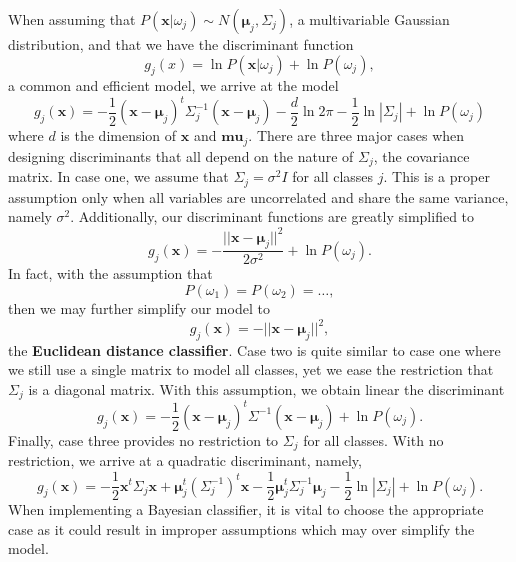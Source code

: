 \documentclass[ 12pt ]{article}
\begin{document}
When assuming that $P(\textbf{x}|\omega_j) \sim N(\mathbf{\mu}_j, \Sigma_j)$, a multivariable Gaussian distribution, and that we have the discriminant function $$g_j(x) = \ln P(\textbf{x}
|\omega_j) + \ln P(\omega_j),$$ a common and efficient model, we arrive at the model $$g_j(\textbf{x}) = -\frac{1}{2}(\textbf{x} - \mathbf{\mu}_j)^t \Sigma_j^{-1}(\textbf{x} -
\mathbf{\mu}_j) - \frac{d}{2} \ln 2\pi - \frac{1}{2} \ln |\Sigma_j| + \ln P(\omega_j)$$ where $d$ is the dimension of $\textbf{x}$ and $\textbf{mu}_j$. There are three major cases when
designing discriminants that all depend on the nature of $\Sigma_j$, the covariance matrix. In case one, we assume that $\Sigma_j = \sigma^2 I$ for all classes $j$. This is a proper
assumption only when all variables are uncorrelated and share the same variance, namely $\sigma^2$. Additionally, our discriminant functions are greatly simplified to $$g_j(\textbf{x})
= -\frac{||\textbf{x} - \mathbf{\mu}_j||^2}{2\sigma^2} + \ln P(\omega_j).$$ In fact, with the assumption that $$P(\omega_1) = P(\omega_2) = \hdots,$$ then we may further simplify our
model to $$g_j(\textbf{x}) = -||\textbf{x} - \mathbf{\mu}_j||^2,$$ the \textbf{Euclidean distance classifier}. Case two is quite similar to case one where we still use a single matrix
to model all classes, yet we ease the restriction that $\Sigma_j$ is a diagonal matrix. With this assumption, we obtain linear the discriminant $$g_j(\textbf{x}) = -\frac{1}{2}(
\textbf{x} - \mathbf{\mu}_j)^t \Sigma^{-1} (\textbf{x} - \mathbf{\mu}_j) + \ln P(\omega_j).$$ Finally, case three provides no restriction to $\Sigma_j$ for all classes. With no
restriction, we arrive at a quadratic discriminant, namely, $$g_j(\textbf{x}) = -\frac{1}{2}\textbf{x}^t \Sigma_j \textbf{x} + \mathbf{\mu}_j^t \left (\Sigma_j^{-1} \right )^t
\textbf{x} - \frac{1}{2}\mathbf{\mu}_j^t \Sigma_j^{-1} \mathbf{\mu}_j - \frac{1}{2} \ln |\Sigma_j| + \ln P(\omega_j).$$ When implementing a Bayesian classifier, it is vital to choose
the appropriate case as it could result in improper assumptions which may over simplify the model.
\end{document}

